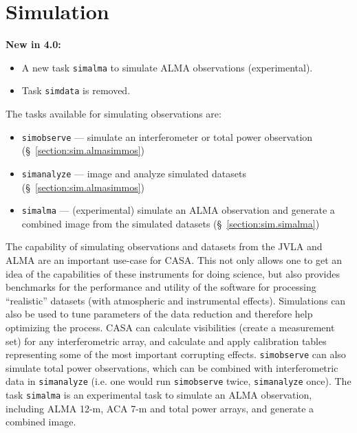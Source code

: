
\chapter[Simulation]{Simulation}
\label{chapter:sim}

{\bfseries New in 4.0:}
\begin{itemize}
\item A new task {\tt simalma} to simulate ALMA observations
  (experimental).
\item Task {\tt simdata} is removed.
\end{itemize}


The tasks available for simulating observations are:
\begin{itemize}
\item {\tt simobserve} --- simulate an interferometer or total power
observation (\S~\ref{section:sim.almasimmos})
\item {\tt simanalyze} --- image and analyze simulated datasets
(\S~\ref{section:sim.almasimmos})
\item {\tt simalma} --- (experimental) simulate an ALMA observation and
generate a combined image from the simulated datasets
(\S~\ref{section:sim.simalma})
\end{itemize}

The capability of simulating observations and datasets from the JVLA
and ALMA are an important use-case for CASA.  This not only allows one
to get an idea of the capabilities of these instruments for doing
science, but also provides benchmarks for the performance and utility
of the software for processing ``realistic'' datasets (with
atmospheric and instrumental effects).  Simulations can
also be used to tune parameters of the data reduction and therefore
help optimizing the process.
CASA can calculate
visibilities (create a measurement set) for any interferometric array,
and calculate and apply calibration tables representing some of the
most important corrupting effects. {\tt simobserve} can also simulate
total power observations, which can be combined with interferometric
data in {\tt simanalyze} (i.e. one would run {\tt simobserve} twice,
{\tt simanalyze} once).
The task {\tt simalma} is an experimental task to simulate an ALMA
observation, including ALMA 12-m, ACA 7-m and total power arrays, and
generate a combined image.


